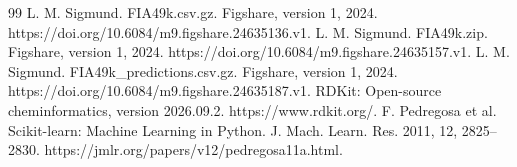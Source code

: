 \begin{thebibliography}{99}
 L. M. Sigmund. FIA49k.csv.gz. Figshare, version 1, 2024. https://doi.org/10.6084/m9.figshare.24635136.v1.
 L. M. Sigmund. FIA49k.zip. Figshare, version 1, 2024. https://doi.org/10.6084/m9.figshare.24635157.v1.
 L. M. Sigmund. FIA49k\_predictions.csv.gz. Figshare, version 1, 2024. https://doi.org/10.6084/m9.figshare.24635187.v1.
 RDKit: Open-source cheminformatics, version 2026.09.2. https://www.rdkit.org/.
 F. Pedregosa et al. Scikit-learn: Machine Learning in Python. J. Mach. Learn. Res. 2011, 12, 2825--2830. https://jmlr.org/papers/v12/pedregosa11a.html.
\end{thebibliography}
